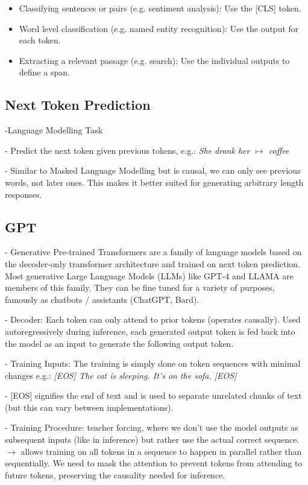 \begin{itemize}
  \item Classifying sentences or pairs (e.g. sentiment analysis): Use the [CLS] token.
  \item Word level classification (e.g. named entity recognition): Use the output for each token.
  \item Extracting a relevant passage (e.g. search): Use the individual outputs to define a span.
\end{itemize}

\subsection*{Next Token Prediction}
-Language Modelling Task

- Predict the next token given previous tokens, e.g.: \textit{She drank her $\mapsto$ coffee}

- Similar to Masked Language Modelling but is causal, we can only see previous words, not later ones. This makes it better suited for generating arbitrary length responses.

\subsection*{GPT}
- Generative Pre-trained Transformers are a family of language models based on the decoder-only transformer architecture and trained on next token prediction. Most generative Large Language Models (LLMs) like GPT-4 and LLAMA are members of this family. They can be fine tuned for a variety of purposes, famously as chatbots / assistants (ChatGPT, Bard).

- Decoder: Each token can only attend to prior tokens (operates causally). Used autoregressively during inference, each generated output token is fed back into the model as an input to generate the following output token.

- Training Inputs: The training is simply done on token sequences with minimal changes e.g.:
\textit{
[EOS] The cat is sleeping. It's on the sofa. [EOS]
}

- [EOS] signifies the end of text and is used to separate unrelated chunks of text (but this can vary between implementations).

- Training Procedure: teacher forcing, where we don't use the model outputs as subsequent inputs (like in inference) but rather use the actual correct sequence. $\rightarrow$ allows training on all tokens in a sequence to happen in parallel rather than sequentially. We need to mask the attention to prevent tokens from attending to future tokens, preserving the causality needed for inference.

